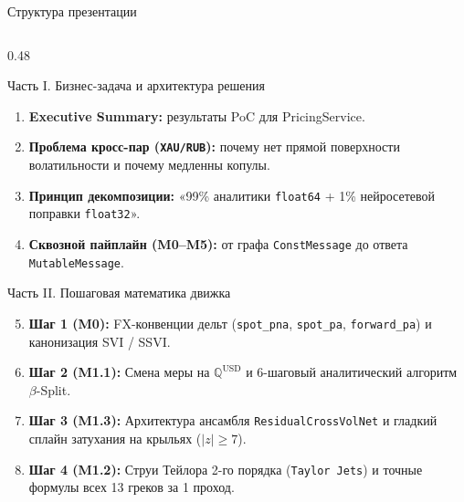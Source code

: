 \documentclass[aspectratio=169, 9pt]{beamer}
\begin{document}
\begin{frame}{Структура презентации}
  \begin{columns}[T]
    \begin{column}{0.48\textwidth}
      \begin{block}{Часть I. Бизнес-задача и архитектура решения}
        \begin{enumerate}
          \item \textbf{Executive Summary:} результаты PoC для PricingService.
          \item \textbf{Проблема кросс-пар (\texttt{XAU/RUB}):} почему нет прямой поверхности волатильности и почему медленны копулы.
          \item \textbf{Принцип декомпозиции:} «99\% аналитики \texttt{float64} + 1\% нейросетевой поправки \texttt{float32}».
          \item \textbf{Сквозной пайплайн (M0--M5):} от графа \texttt{ConstMessage} до ответа \texttt{MutableMessage}.
        \end{enumerate}
      \end{block}

      \begin{block}{Часть II. Пошаговая математика движка}
        \begin{enumerate}\setcounter{enumi}{4}
          \item \textbf{Шаг 1 (M0):} FX-конвенции дельт (\texttt{spot\_pna}, \texttt{spot\_pa}, \texttt{forward\_pa}) и канонизация SVI / SSVI.
          \item \textbf{Шаг 2 (M1.1):} Смена меры на $\mathbb{Q}^{\text{USD}}$ и 6-шаговый аналитический алгоритм $\beta$-Split.
          \item \textbf{Шаг 3 (M1.3):} Архитектура ансамбля \texttt{ResidualCrossVolNet} и гладкий сплайн затухания на крыльях ($|z| \ge 7$).
          \item \textbf{Шаг 4 (M1.2):} Струи Тейлора 2-го порядка (\texttt{Taylor Jets}) и точные формулы всех 13 греков за 1 проход.
        \end{enumerate}
      \end{block}
    \end{column}


\end{columns}
\end{frame}
\end{document}
